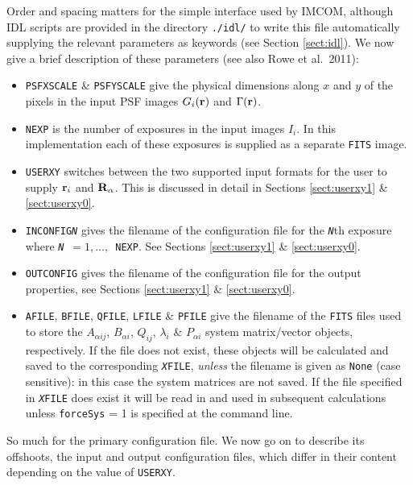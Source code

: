 \documentclass[10pt]{article}
\begin{document}
Order and spacing matters for the simple interface used by IMCOM, although IDL scripts are provided in the directory \texttt{./idl/} to write this file automatically supplying the relevant parameters as keywords (see Section \ref{sect:idl}).
We now give a brief description of these parameters (see also Rowe et al.\ 2011):
\begin{itemize}
\item \texttt{PSFXSCALE} \& \texttt{PSFYSCALE} give the physical dimensions along $x$ and $y$ of the pixels in the input PSF images $G_i({\bf r})$ and $\Gamma({\bf r})$.

\item \texttt{NEXP} is the number of exposures in the input images $I_i$.  In this implementation each of these exposures is supplied as a separate \texttt{FITS} image.

\item \texttt{USERXY} switches between the two supported input formats for the user to supply ${\bf r}_i$ and ${\bf R}_{\alpha}$. This is discussed in detail in Sections \ref{sect:userxy1} \& \ref{sect:userxy0}.

\item \texttt{INCONFIG\emph{N}} gives the filename of the configuration file for the \texttt{\emph{N}}th exposure where \texttt{\emph{N}}~$= 1,\ldots,$~\texttt{NEXP}.  See Sections \ref{sect:userxy1} \& \ref{sect:userxy0}.

\item \texttt{OUTCONFIG} gives the filename of the configuration file for the output properties, see Sections \ref{sect:userxy1} \& \ref{sect:userxy0}.

\item \texttt{AFILE}, \texttt{BFILE}, \texttt{QFILE}, \texttt{LFILE} \& \texttt{PFILE} give the filename of the \texttt{FITS} files used to store the $A_{\alpha i j}$, $B_{\alpha i}$, $Q_{i j}$, $\lambda_i$ \& $P_{\alpha i}$ system matrix/vector objects, respectively.  If the file does not exist, these objects will be calculated and saved to the corresponding \texttt{\emph{X}FILE}, \emph{unless} the filename is given as \texttt{None} (case sensitive): in this case the system matrices are not saved.  If the file specified in \texttt{\emph{X}FILE} does exist it will be read in and used in subsequent calculations unless \texttt{forceSys} = 1 is specified at the command line.
\end{itemize}

So much for the primary configuration file.  We now go on to describe its offshoots, the input and output configuration files, which differ in their content depending on the value of \texttt{USERXY}.
\end{document}
